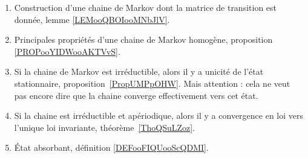 	\label{THEMEooMarkov}

\begin{enumerate}
	\item
	      Construction d'une chaine de Markov dont la matrice de transition est donnée, lemme \ref{LEMooQBOIooMNbJlV}.
	\item
	      Principales propriétés d'une chaine de Markov homogène, proposition \ref{PROPooYIDWooAKTVvS}.
	\item
	      Si la chaine de Markov est irréductible, alors il y a unicité de l'état stationnaire, proposition~\ref{PropUMPpOHW}. Mais attention : cela ne veut pas encore dire que la chaine converge effectivement vers cet état.
	\item
	      Si la chaine est irréductible et apériodique, alors il y a convergence en loi vers l'unique loi invariante, théorème~\ref{ThoQSuLZoz}.
	\item
	      État absorbant, définition \ref{DEFooFIQUooScQDMI}.
\end{enumerate}
